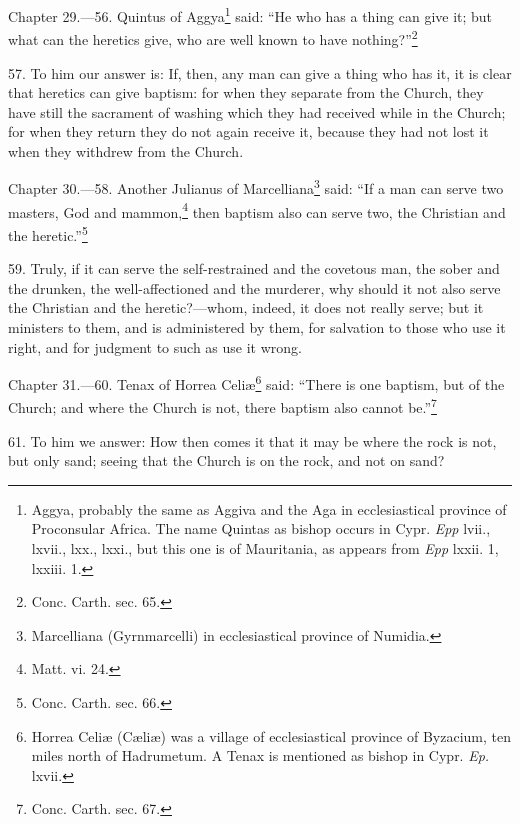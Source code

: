 
Chapter 29.—56. Quintus of Aggya\footnote{\par  Aggya, probably the same as Aggiva and the Aga in ecclesiastical province of Proconsular Africa. The name Quintas as bishop occurs in Cypr. \emph{Epp} lvii., lxvii., lxx., lxxi., but this one is of Mauritania, as appears from \emph{Epp} lxxii. 1, lxxiii. 1.} said: ``He who has a thing can give it; but what can the heretics give, who are well known to have nothing?''\footnote{\par  Conc. Carth. sec. 65.}

57. To him our answer is: If, then, any man can give a thing who has it, it is clear that heretics can give baptism: for when they separate from the Church, they have still the sacrament of washing which they had received while in the Church; for when they return they do not again receive it, because they had not lost it when they withdrew from the Church.


Chapter 30.—58. Another Julianus of Marcelliana\footnote{\par  Marcelliana (Gyrnmarcelli) in ecclesiastical province of Numidia.} said: ``If a man can serve two masters, God and mammon,\footnote{\par  Matt. vi. 24.} then baptism also can serve two, the Christian and the heretic.''\footnote{\par  Conc. Carth. sec. 66.}

59. Truly, if it can serve the self-restrained and the covetous man, the sober and the drunken, the well-affectioned and the murderer, why should it not also serve the Christian and the heretic?—whom, indeed, it does not really serve; but it ministers to them, and is administered by them, for salvation to those who use it right, and for judgment to such as use it wrong.


Chapter 31.—60. Tenax of Horrea Celiæ\footnote{\par  Horrea Celiæ (Cæliæ) was a village of ecclesiastical province of Byzacium, ten miles north of Hadrumetum. A Tenax is mentioned as bishop in Cypr. \emph{Ep.} lxvii.} said: ``There is one baptism, but of the Church; and where the Church is not, there baptism also cannot be.''\footnote{\par  Conc. Carth. sec. 67.}

61. To him we answer: How then comes it that it may be where the rock is not, but only sand; seeing that the Church is on the rock, and not on sand?

